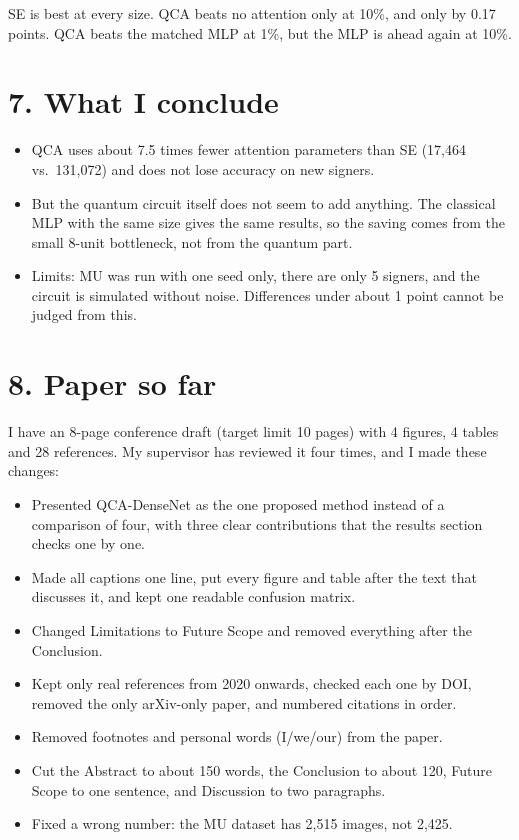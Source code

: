 \documentclass[11pt,a4paper]{article}
\begin{document}
SE is best at every size. QCA beats no attention only at 10\%, and only by
0.17 points. QCA beats the matched MLP at 1\%, but the MLP is ahead again at
10\%.

\section*{7. What I conclude}

\begin{itemize}
  \item QCA uses about 7.5 times fewer attention parameters than SE (17,464
        vs.\ 131,072) and does not lose accuracy on new signers.
  \item But the quantum circuit itself does not seem to add anything. The
        classical MLP with the same size gives the same results, so the
        saving comes from the small 8-unit bottleneck, not from the quantum
        part.
  \item Limits: MU was run with one seed only, there are only 5 signers, and
        the circuit is simulated without noise. Differences under about
        1 point cannot be judged from this.
\end{itemize}

\section*{8. Paper so far}

I have an 8-page conference draft (target limit 10 pages) with 4 figures,
4 tables and 28 references. My supervisor has reviewed it four times, and I
made these changes:

\begin{itemize}
  \item Presented QCA-DenseNet as the one proposed method instead of a
        comparison of four, with three clear contributions that the results
        section checks one by one.
  \item Made all captions one line, put every figure and table after the
        text that discusses it, and kept one readable confusion matrix.
  \item Changed Limitations to Future Scope and removed everything after the
        Conclusion.
  \item Kept only real references from 2020 onwards, checked each one by DOI,
        removed the only arXiv-only paper, and numbered citations in order.
  \item Removed footnotes and personal words (I/we/our) from the paper.
  \item Cut the Abstract to about 150 words, the Conclusion to about 120,
        Future Scope to one sentence, and Discussion to two paragraphs.
  \item Fixed a wrong number: the MU dataset has 2,515 images, not 2,425.
\end{itemize}
\end{document}
